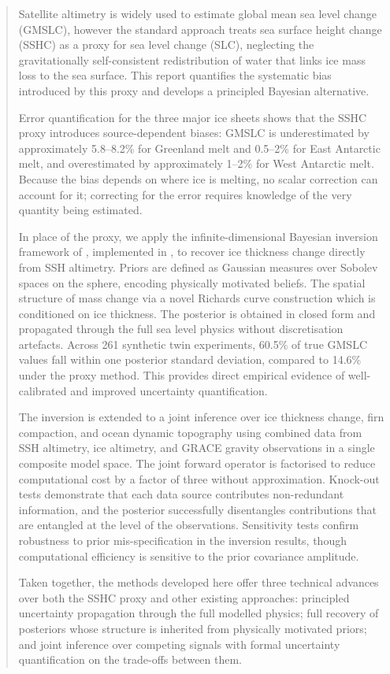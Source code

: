 \begin{abstract}
Satellite altimetry is widely used to estimate global mean sea level change (GMSLC), however the standard approach treats sea surface height change (SSHC) as a proxy for sea level change (SLC), neglecting the gravitationally self-consistent redistribution of water that links ice mass loss to the sea surface. This report quantifies the systematic bias introduced by this proxy and develops a principled Bayesian alternative.

Error quantification for the three major ice sheets shows that the SSHC proxy introduces source-dependent biases: GMSLC is underestimated by approximately 5.8--8.2\% for Greenland melt and 0.5--2\% for East Antarctic melt, and overestimated by approximately 1--2\% for West Antarctic melt. Because the bias depends on where ice is melting, no scalar correction can account for it; correcting for the error requires knowledge of the very quantity being estimated.

In place of the proxy, we apply the infinite-dimensional Bayesian inversion framework of \textcite{heathcoteScaleableBayesianFramework2026}, implemented in , to recover ice thickness change directly from SSH altimetry. Priors are defined as Gaussian measures over Sobolev spaces on the sphere, encoding physically motivated beliefs. The spatial structure of mass change via a novel Richards curve construction which is conditioned on ice thickness. The posterior is obtained in closed form and propagated through the full sea level physics without discretisation artefacts. Across 261 synthetic twin experiments, 60.5\% of true GMSLC values fall within one posterior standard deviation, compared to 14.6\% under the proxy method. This provides direct empirical evidence of well-calibrated and improved uncertainty quantification.

The inversion is extended to a joint inference over ice thickness change, firn compaction, and ocean dynamic topography using combined data from SSH altimetry, ice altimetry, and GRACE gravity observations in a single composite model space. The joint forward operator is factorised to reduce computational cost by a factor of three without approximation. Knock-out tests demonstrate that each data source contributes non-redundant information, and the posterior successfully disentangles contributions that are entangled at the level of the observations. Sensitivity tests confirm robustness to prior mis-specification in the inversion results, though computational efficiency is sensitive to the prior covariance amplitude.

Taken together, the methods developed here offer three technical advances over both the SSHC proxy and other existing approaches: principled uncertainty propagation through the full modelled physics; full recovery of posteriors whose structure is inherited from physically motivated priors; and joint inference over competing signals with formal uncertainty quantification on the trade-offs between them.
\end{abstract}
